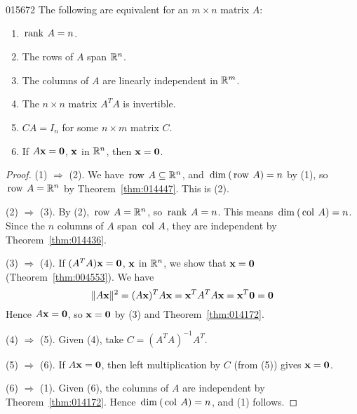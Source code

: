 {{\begin{theorem}{}{015672} %
The following are equivalent for an $m \times n$ matrix $A$:

\begin{enumerate}
\item $\thinspace\operatorname{rank\medspace} A = n$.

\item The rows of $A$ span $\mathbb{R}^n$.

\item The columns of $A$ are linearly independent in $\mathbb{R}^m$.

\item The $n \times n$ matrix $A^{T}A$ is invertible.

\item $CA = I_{n}$ for some $n \times m$ matrix $C$.

\item If $A\textbf{x} = \textbf{0}$, $\textbf{x}$ in $\mathbb{R}^n$, then $\textbf{x} = \textbf{0}$.

\end{enumerate}
\end{theorem}

\begin{proof}
(1) $\Rightarrow$ (2). We have $\thinspace\operatorname{row\medspace} A \subseteq \mathbb{R}^n$, and $\thinspace\operatorname{dim\medspace}(\thinspace\operatorname{row\medspace} A) = n$ by (1), so $\thinspace\operatorname{row\medspace} A = \mathbb{R}^n$ by Theorem~\ref{thm:014447}. This is (2).

(2) $\Rightarrow$ (3). By (2), $\thinspace\operatorname{row\medspace} A = \mathbb{R}^n$, so $\thinspace\operatorname{rank\medspace} A = n$. This means $\thinspace\operatorname{dim\medspace}(\thinspace\operatorname{col\medspace} A) = n$. Since the $n$ columns of $A$ span $\thinspace\operatorname{col\medspace} A$, they are independent by Theorem~\ref{thm:014436}.

(3) $\Rightarrow$ (4). If $(A^{T}A)\textbf{x} = \textbf{0}$, $\textbf{x}$ in $\mathbb{R}^n$, we show that $\textbf{x} = \textbf{0}$ (Theorem~\ref{thm:004553}). We have
\begin{equation*}
\| A\textbf{x}\|^2 = (A\textbf{x})^TA\textbf{x} = \textbf{x}^TA^TA\textbf{x} = \textbf{x}^T\textbf{0} = \textbf{0}
\end{equation*}
Hence $A\textbf{x} = \textbf{0}$, so $\textbf{x} = \textbf{0}$ by (3) and Theorem~\ref{thm:014172}.

(4) $\Rightarrow$ (5). Given (4), take $C = (A^{T}A)^{-1}A^{T}$.

(5) $\Rightarrow$ (6). If $A\textbf{x} = \textbf{0}$, then left multiplication by $C$ (from (5)) gives $\textbf{x} = \textbf{0}$.

(6) $\Rightarrow$ (1). Given (6), the columns of $A$ are independent by Theorem~\ref{thm:014172}. Hence $\thinspace\operatorname{dim\medspace}(\thinspace\operatorname{col\medspace} A) = n$, and (1) follows.
\end{proof}

}}
